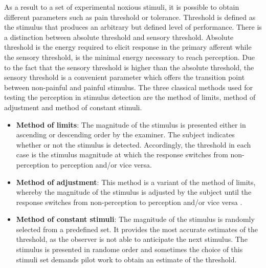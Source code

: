 As a result to a set of experimental noxious stimuli, it is possible to obtain different parameters such as pain threshold or tolerance. Threshold is defined as the stimulus that produces an arbitrary but defined level of performance. There is a distinction between absolute threshold and sensory threshold. Absolute threshold is the energy required to elicit response in the primary afferent while the sensory threshold, is the minimal energy necessary to reach perception. Due to the fact that the sensory threshold is higher than the absolute threshold,  the sensory threshold is a convenient parameter which offers the transition point between non-painful and painful stimulus. \cite{Yarnitsky2006} 
The three classical methods used for testing the perception in stimulus detection are the method of limits, method of adjustment and method of constant stimuli. \cite{Treutwein1995}
\begin{itemize}
	
	\item \textbf{Method of limits}: The magnitude of the stimulus is presented either in ascending or descending order by the examiner. The subject indicates whether or not the stimulus is detected. Accordingly, the threshold in each case is the stimulus magnitude at which the response switches from non-perception to perception and/or vice versa. \cite{Kingdom2016}
	\item \textbf{Method of adjustment}: This method is a variant of the method of limits, whereby the magnitude of the stimulus is adjusted by the subject until the response switches from non-perception to perception and/or vice versa \cite{Kingdom2016}. %
	\item \textbf{Method of constant stimuli}: The magnitude of the stimulus is randomly selected from a predefined set. %
	It provides the most accurate estimates of the threshold, as the observer is not able to anticipate the next stimulus. The stimulus is presented in randome order and sometimes the  choice of this stimuli set demands pilot work to obtain an estimate of the threshold. \cite{Kingdom2016}
\end{itemize}

